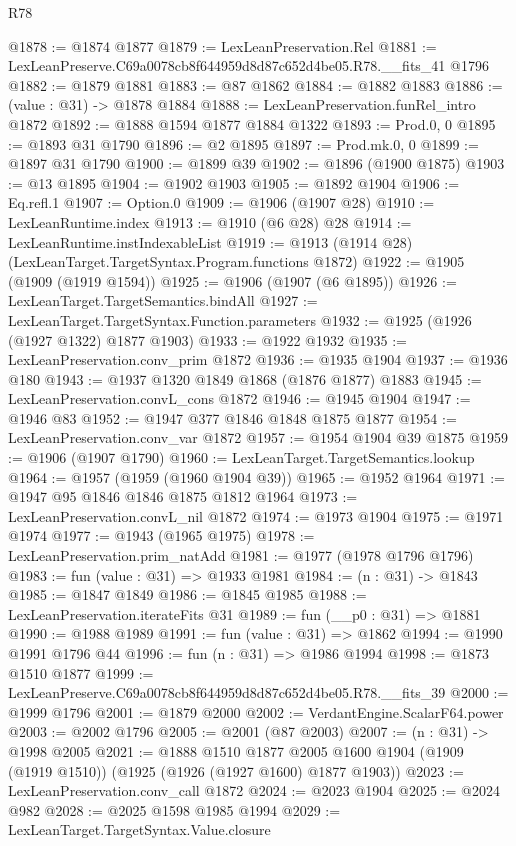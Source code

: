 \begin{lexlean}{R78}
\begin{coremodule}
@1878 := @1874 @1877
@1879 := LexLeanPreservation.Rel
@1881 := LexLeanPreserve.C69a0078cb8f644959d8d87c652d4be05.R78.__fits_41 @1796
@1882 := @1879 @1881
@1883 := @87 @1862
@1884 := @1882 @1883
@1886 := (value : @31) -> @1878 @1884
@1888 := LexLeanPreservation.funRel_intro @1872
@1892 := @1888 @1594 @1877 @1884 @1322
@1893 := Prod.{0, 0}
@1895 := @1893 @31 @1790
@1896 := @2 @1895
@1897 := Prod.mk.{0, 0}
@1899 := @1897 @31 @1790
@1900 := @1899 @39
@1902 := @1896 (@1900 @1875)
@1903 := @13 @1895
@1904 := @1902 @1903
@1905 := @1892 @1904
@1906 := Eq.refl.{1}
@1907 := Option.{0}
@1909 := @1906 (@1907 @28)
@1910 := LexLeanRuntime.index
@1913 := @1910 (@6 @28) @28
@1914 := LexLeanRuntime.instIndexableList
@1919 := @1913 (@1914 @28) (LexLeanTarget.TargetSyntax.Program.functions @1872)
@1922 := @1905 (@1909 (@1919 @1594))
@1925 := @1906 (@1907 (@6 @1895))
@1926 := LexLeanTarget.TargetSemantics.bindAll
@1927 := LexLeanTarget.TargetSyntax.Function.parameters
@1932 := @1925 (@1926 (@1927 @1322) @1877 @1903)
@1933 := @1922 @1932
@1935 := LexLeanPreservation.conv_prim @1872
@1936 := @1935 @1904
@1937 := @1936 @180
@1943 := @1937 @1320 @1849 @1868 (@1876 @1877) @1883
@1945 := LexLeanPreservation.convL_cons @1872
@1946 := @1945 @1904
@1947 := @1946 @83
@1952 := @1947 @377 @1846 @1848 @1875 @1877
@1954 := LexLeanPreservation.conv_var @1872
@1957 := @1954 @1904 @39 @1875
@1959 := @1906 (@1907 @1790)
@1960 := LexLeanTarget.TargetSemantics.lookup
@1964 := @1957 (@1959 (@1960 @1904 @39))
@1965 := @1952 @1964
@1971 := @1947 @95 @1846 @1846 @1875 @1812 @1964
@1973 := LexLeanPreservation.convL_nil @1872
@1974 := @1973 @1904
@1975 := @1971 @1974
@1977 := @1943 (@1965 @1975)
@1978 := LexLeanPreservation.prim_natAdd
@1981 := @1977 (@1978 @1796 @1796)
@1983 := fun (value : @31) => @1933 @1981
@1984 := (n : @31) -> @1843
@1985 := @1847 @1849
@1986 := @1845 @1985
@1988 := LexLeanPreservation.iterateFits @31
@1989 := fun (__p0 : @31) => @1881
@1990 := @1988 @1989
@1991 := fun (value : @31) => @1862
@1994 := @1990 @1991 @1796 @44
@1996 := fun (n : @31) => @1986 @1994
@1998 := @1873 @1510 @1877
@1999 := LexLeanPreserve.C69a0078cb8f644959d8d87c652d4be05.R78.__fits_39
@2000 := @1999 @1796
@2001 := @1879 @2000
@2002 := VerdantEngine.ScalarF64.power
@2003 := @2002 @1796
@2005 := @2001 (@87 @2003)
@2007 := (n : @31) -> @1998 @2005
@2021 := @1888
    @1510
    @1877
    @2005
    @1600
    @1904
    (@1909 (@1919 @1510))
    (@1925 (@1926 (@1927 @1600) @1877 @1903))
@2023 := LexLeanPreservation.conv_call @1872
@2024 := @2023 @1904
@2025 := @2024 @982
@2028 := @2025 @1598 @1985 @1994
@2029 := LexLeanTarget.TargetSyntax.Value.closure

\end{coremodule}
\end{lexlean}
